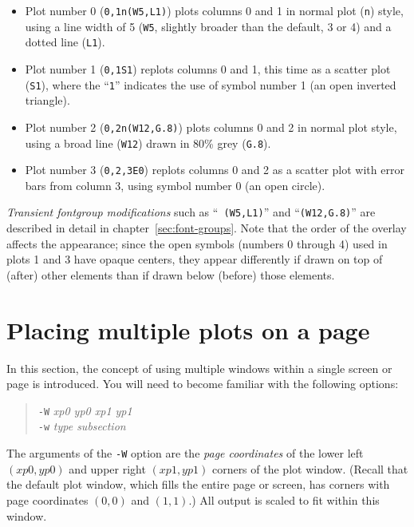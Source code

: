 \documentclass{book}
\begin{document}
\begin{itemize}
\item Plot number 0 ({\tt 0,1n(W5,L1)}) plots columns 0 and 1 in normal plot
({\tt n}) style, using a line width of 5 ({\tt W5}, slightly broader than the
default, 3 or 4) and a dotted line ({\tt L1}).  
\item Plot number 1 ({\tt 0,1S1}) replots columns 0 and 1, this time as
a scatter plot ({\tt S1}), where the ``{\tt 1}'' indicates the use of
symbol number 1 (an open inverted triangle).
\item Plot number 2 ({\tt 0,2n(W12,G.8)}) plots columns 0 and 2 in
normal plot style, using a broad line ({\tt W12}) drawn in 80\% grey
({\tt G.8}).
\item Plot number 3 ({\tt 0,2,3E0}) replots columns 0 and 2 as a
scatter plot with error bars from column 3, using symbol number 0
(an open circle).
\end{itemize}

{\em Transient fontgroup modifications} such as ``{\tt
(W5,L1)}'' and ``{\tt (W12,G.8)}'' are described in detail in
chapter~\ref{sec:font-groups}.  Note that the order of the overlay
affects the appearance; since the open symbols (numbers 0 through 4)
used in plots 1 and 3 have opaque centers, they appear differently if
drawn on top of (after) other elements than if drawn below (before)
those elements.

\section{Placing multiple plots on a page \label{sec:plot-windows}}

%
%
%
In this section, the concept of using multiple windows within a single
screen or page is introduced.  You will need to become familiar with
the following options:

\begin{quote}
{\tt -W} \emph{xp0 yp0 xp1 yp1}\\
{\tt -w} \emph{type subsection}
\end{quote}

%
The arguments of the {\tt -W} option are the {\em page coordinates} of
the lower left $(xp0,yp0)$ and upper right $(xp1,yp1)$ corners of the
plot window.  (Recall that the default plot window, which fills the
entire page or screen, has corners with page coordinates $(0,0)$ and
$(1,1)$.)  All output is scaled to fit within this window.  
\end{document}
